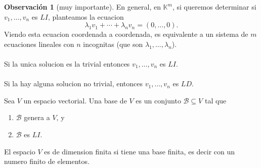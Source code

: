 \documentclass{article}
\theoremstyle{definition}
\theoremstyle{definition}
\newtheorem*{obs}{Observación}
\theoremstyle{remark}
\begin{document}
\begin{obs}[muy importante]
  En general, en $\mathbb{K}^m$, si queremos determinar si $v_1, \dots ,v_n$ es $LI$, planteamos la ecuacion \[
\lambda_1v_1 + \cdots + \lambda_n v_n = (0, \dots ,0).
  \]
Viendo esta ecuacion coordenada a coordenada, es equivalente a un sistema de $m$ ecuaciones lineales con $n$ incognitas (que son $\lambda_1, \dots ,\lambda_n$). \\\\ Si la unica solucion es la trivial entonces $v_1, \dots ,v_n$ es $LI$. \\\\ Si la hay alguna solucion no trivial, entonces $v_1, \dots ,v_n$ es $LD$.
\end{obs}
\begin{defi}
  Sea $V$ un espacio vectorial. Una base de $V$ es un conjunto $\mathcal{B} \subseteq V$ tal que \begin{enumerate}[label=\arabic*.] 
    \item $\mathcal{B}$ genera a $V$, y 
    \item $\mathcal{B}$ es $LI$.
    \end{enumerate}
    El espacio $V$ es de dimension finita si tiene una base finita, es decir con un numero finito de elementos.
\end{defi}
\end{document}
